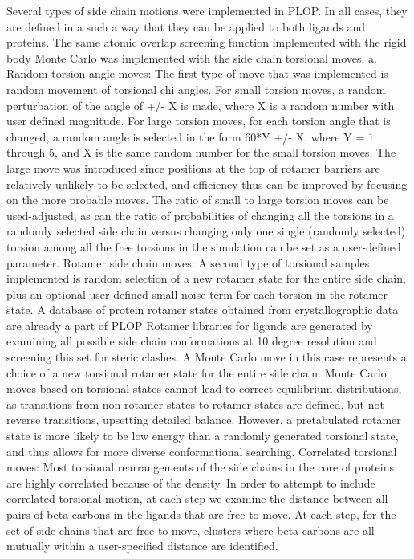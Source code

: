 Several types of side chain motions were implemented in PLOP.
In all cases, they are defined in a such a way that they can be applied to both ligands and proteins.
The same atomic overlap screening function implemented with the rigid body Monte Carlo was implemented with the side chain torsional moves.
a. Random torsion angle moves: The first type of move that was implemented is random movement of torsional chi angles.
For small torsion moves, a random perturbation of the angle of +/- X is made, where X is a random number with user defined magnitude.
For large torsion moves, for each torsion angle that is changed, a random angle is selected in the form 60*Y +/- X, where Y = 1 through 5, and X is the same random number for the small torsion moves.
The large move was introduced since positions at the top of rotamer barriers are relatively unlikely to be selected, and efficiency thus can be improved by focusing on the more probable moves.
The ratio of small to large torsion moves can be used-adjusted, as can the ratio of probabilities of changing all the torsions in a randomly selected side chain versus changing only one single (randomly selected) torsion among all the free torsions in the simulation can be set as a user-defined parameter.
Rotamer side chain moves: A second type of torsional samples implemented is random selection of a new rotamer state for the entire side chain, plus an optional user defined small noise term for each torsion in the rotamer state.
A database of protein rotamer states obtained from crystallographic data are already a part of PLOP \cite{xiang2001extending} Rotamer libraries for ligands are generated by examining all possible side chain conformations at 10 degree resolution and screening this set for steric clashes.
A Monte Carlo move in this case represents a choice of a new torsional rotamer state for the entire side chain.
Monte Carlo moves based on torsional states cannot lead to correct equilibrium distributions, as transitions from non-rotamer states to rotamer states are defined, but not reverse transitions, upsetting detailed balance.
However, a pretabulated rotamer state is more likely to be low energy than a randomly generated torsional state, and thus allows for more diverse conformational searching.
Correlated torsional moves: Most torsional rearrangements of the side chains in the core of proteins are highly correlated because of the density.
In order to attempt to include correlated torsional motion, at each step we examine the distance between all pairs of beta carbons in the ligands that are free to move.
At each step, for the set of side chains that are free to move, clusters where beta carbons are all mutually within a user-specified distance are identified.
